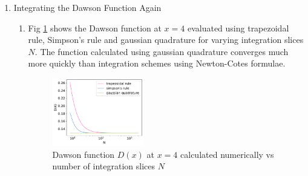 \documentclass{article}
\begin{document}
\begin{enumerate}
\item Integrating the Dawson Function Again
\begin{enumerate}
  \item Fig \ref{fig:2a} shows the Dawson function at $x=4$ evaluated using trapezoidal rule, Simpson's rule and gaussian quadrature for varying integration slices $N$. 
  The function calculated using gaussian quadrature converges much more quickly than integration schemes using Newton-Cotes formulae.
  \begin{figure}[h]
    \centering 
    \includegraphics[width=0.4\textwidth]{Q2a.pdf}
    \caption{Dawson function $D(x)$ at $x=4$ calculated numerically vs number of integration slices $N$}
    \label{fig:2a}
  \end{figure}


\end{enumerate}
\end{enumerate}
\end{document}
